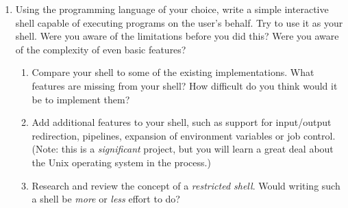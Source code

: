 \begin{enumerate}
\item
Using the programming language of your choice, write a simple interactive
shell capable of executing programs on the user's behalf.  Try to use it
as your shell.  Were you aware of the limitations before you did this?
Were you aware of the complexity of even basic features?

\begin{enumerate}

\item
Compare your shell to some of the existing implementations.  What features
are missing from your shell?  How difficult do you think would it be to
implement them?

\item
Add additional features to your shell, such as support for input/output
redirection, pipelines, expansion of environment variables or job control.
(Note: this is a {\em significant} project, but you will learn a great
deal about the Unix operating system in the process.)

\item
Research and review the concept of a {\em restricted shell}.  Would
writing such a shell be {\em more} or {\em less} effort to do?
\end{enumerate}

\end{enumerate}

\pagebreak

